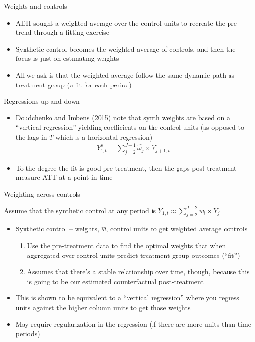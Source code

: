 \documentclass{beamer}
\begin{document}
\begin{frame}{Weights and controls}

\begin{itemize}
\item ADH sought a weighted average over the control units to recreate the pre-trend through a fitting exercise
\item Synthetic control becomes the weighted average of controls, and then the focus is just on estimating weights
\item All we ask is that the weighted average follow the same dynamic path as treatment group (a fit for each period)

\end{itemize}

\end{frame}

\begin{frame}{Regressions up and down}

\begin{itemize}
\item Doudchenko and Imbens (2015) note that synth weights are based on a ``vertical regression'' yielding coefficients on the control units (as opposed to the lags in $T$ which is a horizontal regression)
\begin{eqnarray*}
Y^0_{1,t} = \sum_{j=2}^{J+1} \widehat{\omega_j} \times Y_{j+1,t}
\end{eqnarray*}
\item To the degree the fit is good pre-treatment, then the gaps post-treatment measure ATT at a point in time

\end{itemize}

\end{frame}


\begin{frame}{Weighting across controls}

Assume that the synthetic control at any period is $Y_{1,t} \approx \sum_{j=2}^{J+2} w_i \times Y_{j}$
\begin{itemize}
\item Synthetic control -- weights, $\widehat{w}$, control units to get weighted average controls
	\begin{enumerate}
	\item Use the pre-treatment data to find the optimal weights that when aggregated over control units predict treatment group outcomes (``fit'')
	\item Assumes that there's a stable relationship over time, though, because this is going to be our estimated counterfactual post-treatment
	\end{enumerate}
\item This is shown to be equivalent to a ``vertical regression'' where you regress units against the higher column units to get those weights
\item May require regularization in the regression (if there are more units than time periods)
\end{itemize}

\end{frame}
\end{document}
